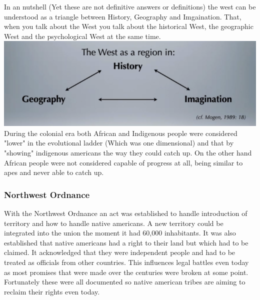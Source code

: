 \documentclass{article}
\begin{document}
	In an nutshell (Yet these are not definitive answers or definitions) the west can be understood as a triangle between History, Geography and Imgaination. That, when you talk about the West you talk about the historical West, the geographic West and the psychological West at the same time. \\
	\includegraphics{Understanding.png} \\
	During the colonial era both African and Indigenous people were considered "lower" in the evolutional ladder (Which was one dimensional) and that by "showing" indigenous americans the way they could catch up. On the other hand African people were not considered capable of progress at all, being similar to apes and never able to catch up. \\
	\subsubsection{Northwest Ordnance}
	With the Northwest Ordnance an act was established to handle introduction of territory and how to handle native americans. A new territory could be integrated into the union the moment it had 60,000 inhabitants. It was also established that native americans had a right to their land but which had to be claimed. It acknowledged that they were independent people and had to be treated as officials from other countries. This influences legal battles even today as most promises that were made over the centuries were broken at some point. Fortunately these were all documented so native american tribes are aiming to reclaim their rights even today. \\
\end{document}
